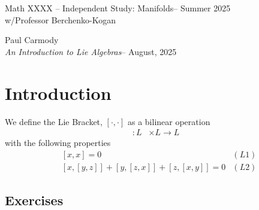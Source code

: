 \documentclass[12pt,a4paper]{report}
\newcommand{\CLASSNAME}{Math XXXX -- Independent Study: Manifolds}
\newcommand{\STUDENTNAME}{Paul Carmody}
\newcommand{\ASSIGNMENT}{\textit{An Introduction to Lie Algebras}}
\newcommand{\DUEDATE}{August, 2025}
\newcommand{\PROFESSOR}{Professor Berchenko-Kogan}
\newcommand{\SEMESTER}{Summer 2025}
\begin{document}
\begin{center}
	\Large{\CLASSNAME -- \SEMESTER} \\
	\large{ w/\PROFESSOR}
\end{center}
\begin{center}
	\STUDENTNAME \\
	\ASSIGNMENT -- \DUEDATE\\
\end{center} 

\chapter{Introduction}

\begin{definition}

We define the Lie Bracket, $[\cdot, \cdot]$ as a bilinear operation
\begin{align*}
	[\cdot,\cdot] : L &\times L \to L
\end{align*}with the following properties
\begin{align*}
	&[x,x] =0 & (L1)\\
	&[x, [y,z]] + [y, [z,x]] + [z, [x,y]] =0 & (L2)
\end{align*}
\end{definition}
\section{Exercises}
\end{document}

